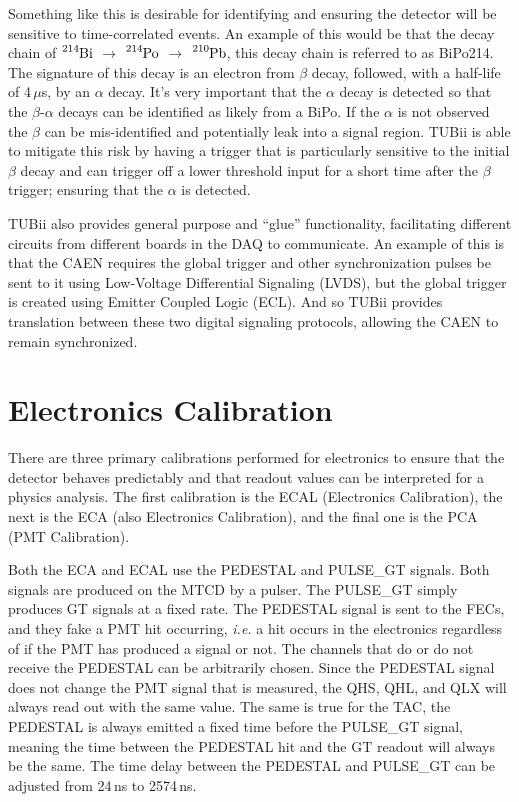 Something like this is desirable for identifying and ensuring the detector will
be sensitive to time-correlated events. An example of this would be that
the decay chain of $\ce{^{214}Bi}$ $\rightarrow$ $\ce{^{214}Po}$ $\rightarrow$ $\ce{^{210}Pb}$,
this decay chain is referred to as BiPo214.
The signature of this decay is an electron from $\beta$ decay, followed, with a half-life
of 4\,$\mu$s, by an $\alpha$ decay.
It's very important that the $\alpha$ decay is detected so that the $\beta$-$\alpha$
decays can be identified as likely from a BiPo. If the $\alpha$ is not observed
the $\beta$ can be mis-identified and potentially leak into a signal region.
TUBii is able to mitigate this risk by having a trigger that is particularly
sensitive to the initial $\beta$ decay and can trigger off a lower
threshold input for a short time after the $\beta$ trigger; ensuring that
the $\alpha$ is detected.

TUBii also provides general purpose and ``glue'' functionality,
facilitating different circuits from different boards in the DAQ to communicate.
An example of this is that the CAEN requires the global trigger and
other synchronization pulses be sent to it using Low-Voltage Differential
Signaling (LVDS), but the global trigger is created using Emitter Coupled
Logic (ECL).
And so TUBii provides translation between these two digital signaling protocols,
allowing the CAEN to remain synchronized.


\section{Electronics Calibration}
There are three primary calibrations performed for electronics to ensure that the
detector behaves predictably and that readout values can be interpreted
for a physics analysis. The first calibration is the ECAL (Electronics Calibration),
the next is the ECA (also Electronics Calibration), and the final one is the PCA (PMT
Calibration).

Both the ECA and ECAL use the PEDESTAL and PULSE\_GT signals. Both signals
are produced on the MTCD by a pulser.
The PULSE\_GT simply produces GT signals at a fixed rate.
The PEDESTAL signal is sent to the FECs, and they fake a PMT hit occurring,
\textit{i.e.} a hit occurs in the electronics regardless of if the PMT has
produced a signal or not.
The channels that do or do not receive the PEDESTAL can be arbitrarily chosen.
Since the PEDESTAL signal does not change the PMT signal that is measured, the
QHS, QHL, and QLX will always read out with the same value. The same is true
for the TAC, the PEDESTAL is always emitted a fixed time before the PULSE\_GT
signal, meaning the time between the PEDESTAL hit and the GT readout will always
be the same.
The time delay between the PEDESTAL and PULSE\_GT can be adjusted from
24\,ns to 2574\,ns.

